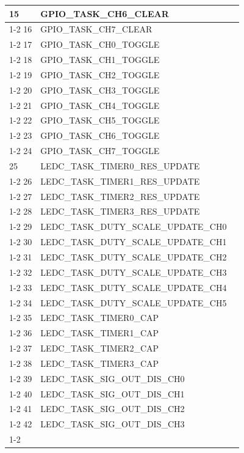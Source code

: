 \documentclass[main\_\_EN.tex]{subfiles}
\begin{document}
\begin{longtable}{ | l | l | l | }
15  & GPIO\_TASK\_CH6\_CLEAR &  \\ \cline{1-2}
16  & GPIO\_TASK\_CH7\_CLEAR &  \\ \cline{1-2}
17  & GPIO\_TASK\_CH0\_TOGGLE  &  \\ \cline{1-2}
18  & GPIO\_TASK\_CH1\_TOGGLE  &  \\ \cline{1-2}
19  & GPIO\_TASK\_CH2\_TOGGLE  &  \\ \cline{1-2}
20  & GPIO\_TASK\_CH3\_TOGGLE  &  \\ \cline{1-2}
21  & GPIO\_TASK\_CH4\_TOGGLE  &  \\ \cline{1-2}
22  & GPIO\_TASK\_CH5\_TOGGLE  &  \\ \cline{1-2}
23  & GPIO\_TASK\_CH6\_TOGGLE  &  \\ \cline{1-2}
24  & GPIO\_TASK\_CH7\_TOGGLE  &  \\ \hline
25  & LEDC\_TASK\_TIMER0\_RES\_UPDATE      & \nameref{mod:ledpwm} \\ \cline{1-2}
26  & LEDC\_TASK\_TIMER1\_RES\_UPDATE      & \\ \cline{1-2}
27  & LEDC\_TASK\_TIMER2\_RES\_UPDATE      & \\ \cline{1-2}
28  & LEDC\_TASK\_TIMER3\_RES\_UPDATE      & \\ \cline{1-2}
29  & LEDC\_TASK\_DUTY\_SCALE\_UPDATE\_CH0 & \\ \cline{1-2}
30  & LEDC\_TASK\_DUTY\_SCALE\_UPDATE\_CH1 & \\ \cline{1-2}
31  & LEDC\_TASK\_DUTY\_SCALE\_UPDATE\_CH2 & \\ \cline{1-2}
32  & LEDC\_TASK\_DUTY\_SCALE\_UPDATE\_CH3 & \\ \cline{1-2}
33  & LEDC\_TASK\_DUTY\_SCALE\_UPDATE\_CH4 & \\ \cline{1-2}
34  & LEDC\_TASK\_DUTY\_SCALE\_UPDATE\_CH5 & \\ \cline{1-2}
35  & LEDC\_TASK\_TIMER0\_CAP  & \\ \cline{1-2}
36  & LEDC\_TASK\_TIMER1\_CAP  & \\ \cline{1-2}
37  & LEDC\_TASK\_TIMER2\_CAP  & \\ \cline{1-2}
38  & LEDC\_TASK\_TIMER3\_CAP  & \\ \cline{1-2}
39  & LEDC\_TASK\_SIG\_OUT\_DIS\_CH0& \\ \cline{1-2}
40  & LEDC\_TASK\_SIG\_OUT\_DIS\_CH1& \\ \cline{1-2}
41  & LEDC\_TASK\_SIG\_OUT\_DIS\_CH2& \\ \cline{1-2}
42  & LEDC\_TASK\_SIG\_OUT\_DIS\_CH3& \\ \cline{1-2}

\end{longtable}
\end{document}
